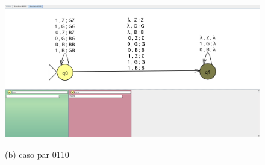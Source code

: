 \documentclass{article}
\begin{document}
        \begin{figure}[!h]
            \centering
            \includegraphics[width=\textwidth]{./Imagenes/image31.png}
            \label{fig:label4}
            \caption*{(b) caso par 0110}
        \end{figure}
    
\end{document}
